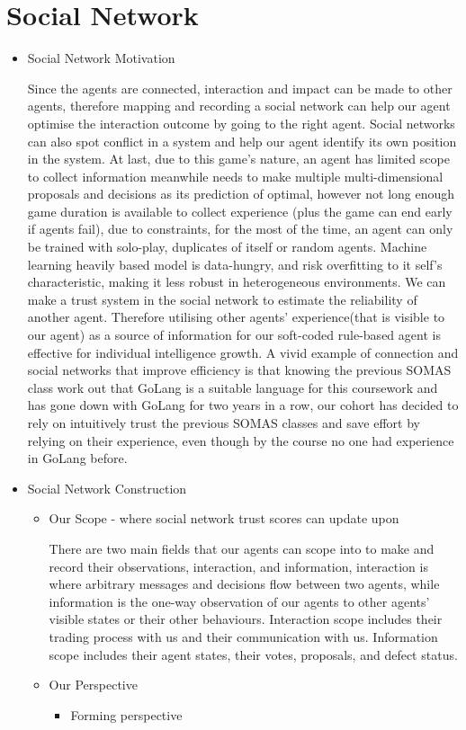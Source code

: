 \section{Social Network}

\begin{itemize}
    \item Social Network Motivation
          \begin{flushleft}
              \setlength{\parindent}{2em}
              Since the agents are connected, interaction and impact can be made to other agents, therefore mapping and recording a social network can help our agent optimise the interaction outcome by going to the right agent. Social networks can also spot conflict in a system and help our agent identify its own position in the system. At last, due to this game's nature, an agent has limited scope to collect information meanwhile needs to make multiple multi-dimensional proposals and decisions as its prediction of optimal, however not long enough game duration is available to collect experience (plus the game can end early if agents fail), due to constraints, for the most of the time, an agent can only be trained with solo-play, duplicates of itself or random agents. Machine learning heavily based model is data-hungry, and risk overfitting to it self's characteristic, making it less robust in heterogeneous environments. We can make a trust system in the social network to estimate the reliability of another agent. Therefore utilising other agents' experience(that is visible to our agent) as a source of information for our soft-coded rule-based agent is effective for individual intelligence growth. A vivid example of connection and social networks that improve efficiency is that knowing the previous SOMAS class work out that GoLang is a suitable language for this coursework and has gone down with GoLang for two years in a row, our cohort has decided to rely on intuitively trust the previous SOMAS classes and save effort by relying on their experience, even though by the course no one had experience in GoLang before.

          \end{flushleft}
    \item Social Network Construction
          \begin{itemize}
              \item  Our Scope - where social network trust scores can update upon

                    There are two main fields that our agents can scope into to make and record their observations, interaction, and information, interaction is where arbitrary messages and decisions flow between two agents, while information is the one-way observation of our agents to other agents' visible states or their other behaviours. Interaction scope includes their trading process with us and their communication with us. Information scope includes their agent states, their votes, proposals, and defect status.
              \item Our Perspective
                    \begin{itemize}
                        \item Forming perspective


\end{itemize}
\end{itemize}
\end{itemize}
